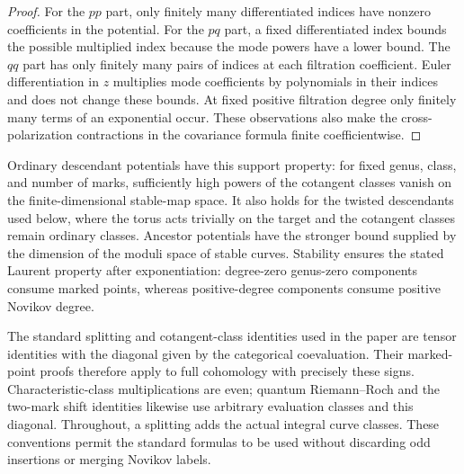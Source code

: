 \begin{proof}
For the $pp$ part, only finitely many differentiated indices have nonzero
coefficients in the potential.  For the $pq$ part, a fixed differentiated
index bounds the possible multiplied index because the mode powers have
a lower bound.  The $qq$ part has only finitely many pairs of indices at
each filtration coefficient.  Euler differentiation in $z$ multiplies
mode coefficients by polynomials in their indices and does not change
these bounds.  At fixed positive filtration degree only finitely many
terms of an exponential occur.  These observations also make the
cross-polarization contractions in the covariance formula finite
coefficientwise.
\end{proof}

Ordinary descendant potentials have this support property: for fixed
genus, class, and number of marks, sufficiently high powers of the
cotangent classes vanish on the finite-dimensional stable-map space.
It also holds for the twisted descendants used below, where the torus
acts trivially on the target and the cotangent classes remain ordinary
classes.  Ancestor potentials have the stronger bound supplied by the
dimension of the moduli space of stable curves.
Stability ensures the stated Laurent property after exponentiation:
degree-zero genus-zero components consume marked points, whereas
positive-degree components consume positive Novikov degree.

The standard splitting and cotangent-class identities used in the paper
are tensor identities with the diagonal given by the categorical
coevaluation.  Their marked-point proofs therefore apply to full
cohomology with precisely these signs.  Characteristic-class
multiplications are even; quantum Riemann--Roch and the two-mark shift
identities likewise use arbitrary evaluation classes and this diagonal.
Throughout, a splitting adds the actual integral curve classes.  These
conventions permit the standard formulas to be used without discarding
odd insertions or merging Novikov labels.
